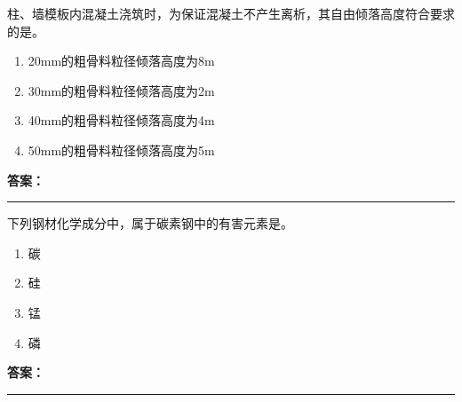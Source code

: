 \documentclass[UTF8,fontset=fandol,11pt]{ctexart}
\newcommand{\answerline}{\textcolor{answerred}{\rule{2.4cm}{0.7pt}}}
\begin{document}
\vspace{0.2em}

\begin{quizbox}[title={乱序第 133 题｜第四章混凝土结构工程}]

柱、墙模板内混凝土浇筑时，为保证混凝土不产生离析，其自由倾落高度符合要求的是。\\

\begin{enumerate}[label=\Alph*.]

\item 20mm的粗骨料粒径倾落高度为8m

\item 30mm的粗骨料粒径倾落高度为2m

\item 40mm的粗骨料粒径倾落高度为4m

\item 50mm的粗骨料粒径倾落高度为5m

\end{enumerate}

\textbf{\textcolor{answerred}{答案：}} \answerline

\end{quizbox}

\vspace{0.2em}

\begin{quizbox}[title={乱序第 134 题｜第四章混凝土结构工程}]

下列钢材化学成分中，属于碳素钢中的有害元素是。\\

\begin{enumerate}[label=\Alph*.]

\item 碳

\item 硅

\item 锰

\item 磷

\end{enumerate}

\textbf{\textcolor{answerred}{答案：}} \answerline

\end{quizbox}

\vspace{0.2em}
\end{document}
